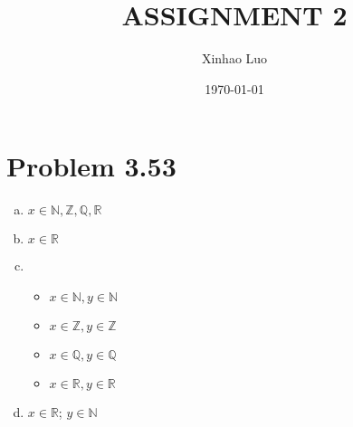 \documentclass{article}
\title{\bf \Large ASSIGNMENT 2}
\author{Xinhao Luo}
\date{\today}
\def\math#1{$#1$}
\begin{document}
\maketitle
\medskip

\section{Problem 3.53}
\begin{enumerate}[(a)]
    \item \math{x \in \mathbb{N}, \mathbb{Z}, \mathbb{Q}, \mathbb{R}}
    \item \math{x \in \mathbb{R}}
    \item 
        \begin{itemize}
            \item \math{x \in \mathbb{N}, y \in \mathbb{N}}
            \item \math{x \in \mathbb{Z}, y \in \mathbb{Z}}
            \item \math{x \in \mathbb{Q}, y \in \mathbb{Q}}
            \item \math{x \in \mathbb{R}, y \in \mathbb{R}}
        \end{itemize}
    \item \math{x \in \mathbb{R}}; \math{y \in \mathbb{N}}
\end{enumerate}
\end{document}

